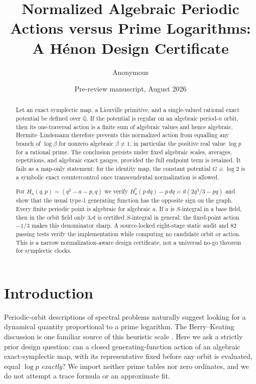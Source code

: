 \documentclass[11pt]{article}
\title{\textbf{Normalized Algebraic Periodic Actions versus Prime Logarithms:\\
A H\'enon Design Certificate}}
\author{Anonymous}
\date{Pre-review manuscript, August 2026}
\theoremstyle{definition}
\theoremstyle{remark}
\newcommand{\Qbar}{\overline{\mathbb Q}}
\newcommand{\Action}{\mathcal A}
\begin{document}
\maketitle

\begin{abstract}
Let an exact symplectic map, a Liouville primitive, and a single-valued
rational exact potential be defined over $\Qbar$.  If the potential is
regular on an algebraic period-$n$ orbit, then its one-traversal action is a
finite sum of algebraic values and hence algebraic.  Hermite--Lindemann
therefore prevents this normalized action from equalling any branch of
$\log\beta$ for nonzero algebraic $\beta\ne1$, in particular the positive
real value $\log p$ for a rational prime.  The conclusion persists under
fixed algebraic scales, averages, repetitions, and algebraic exact gauges,
provided the full endpoint term is retained.  It fails as a map-only
statement: for the identity map, the constant potential $G\equiv\log 2$ is a
symbolic exact countercontrol once transcendental normalization is allowed.

For $H_a(q,p)=(q^2-a-p,q)$ we verify
$H_a^*(p\,dq)-p\,dq=d(2q^3/3-pq)$ and show that the usual type-1 generating
function has the opposite sign on the graph.  Every finite periodic point is
algebraic for algebraic $a$.  If $a$ is $S$-integral in a base field, then in
the orbit field only $3\Action$ is certified $S$-integral in general; the
fixed-point action $-1/3$ makes this denominator sharp.  A source-locked
eight-stage static audit and 82 passing tests verify the implementation while
computing no candidate orbit or action.  This is a narrow normalization-aware
design certificate, not a universal no-go theorem for symplectic clocks.
\end{abstract}

\section{Introduction}
\label{sec:introduction}

Periodic-orbit descriptions of spectral problems naturally suggest looking
for a dynamical quantity proportional to a prime logarithm.  The
Berry--Keating discussion is one familiar source of this heuristic scale
\citep{berry1999riemann}.  Here we ask a strictly prior design question:
can a closed generating-function action of an algebraic exact-symplectic map,
with its representative fixed before any orbit is evaluated, equal $\log p$
\emph{exactly}?  We import neither prime tables nor zero ordinates, and we do
not attempt a trace formula or an approximate fit.
\end{document}
